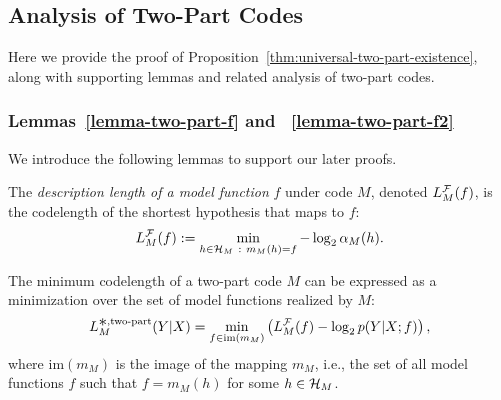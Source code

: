 \subsection{Analysis of Two-Part Codes}

Here we provide the proof of Proposition~\ref{thm:universal-two-part-existence}, along with supporting lemmas and related analysis of two-part codes.

\subsubsection{Lemmas~\ref{lemma-two-part-f} and ~\ref{lemma-two-part-f2}}

We introduce the following lemmas to support our later proofs.

\begin{defn}
The \emph{description length of a model function} $f$ under code $M$, denoted $L^{\mathcal{F}}_M(f)$, is the codelength of the shortest hypothesis that maps to $f$:
\begin{equation}
    L^{\mathcal{F}}_{M}(f) := \min_{h \in {\mathcal{H}}_{M}  ~:~ m_M(h)=f} -\log_2 \alpha_M(h).
    \label{eq:function-description-length}
\end{equation}
\end{defn}

\begin{lemma}
\label{lemma-two-part-f}
The minimum codelength of a two-part code $M$ can be expressed as a minimization over the set of model functions realized by $M$:
\begin{equation}
    L_{M}^{\bigast,\text{two-part}}(Y|X) = \min_{f \in \im(m_M)} \left( L^\gF_M(f) - \log_2 p(Y|X;f) \right),
    \label{eq:two-part-as-function-of-f}
\end{equation}
where $\mathrm{im}(m_M)$ is the image of the mapping $m_M$, i.e., the set of all model functions $f$ such that $f=m_M(h)$ for some $h \in {\mathcal{H}}_M$.
\end{lemma}

